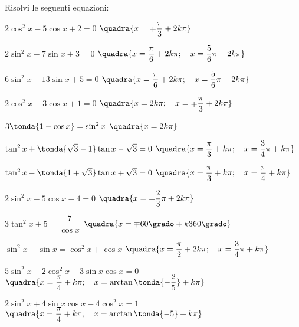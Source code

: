 \begin{esercizio}\label{ese:03.1}
Risolvi le seguenti equazioni:
 \begin{enumeratea}
  \item $2 \cos^2 x - 5 \cos x + 2 = 0$
   \hfill $\quadra{x = \mp \dfrac{\pi}{3} + 2 k \pi}$
  \item $2 \sin^2 x - 7 \sin x + 3 = 0$
   \hfill $\quadra{x = \dfrac{\pi}{6} + 2 k \pi; \quad
                   x = \dfrac{5}{6} \pi + 2 k \pi}$
  \item $6 \sin^2 x - 13 \sin x + 5 = 0$
   \hfill $\quadra{x = \dfrac{\pi}{6} + 2 k \pi; \quad
                   x = \dfrac{5}{6} \pi + 2 k \pi}$
  \item $2 \cos^2 x - 3 \cos x + 1 = 0$
   \hfill $\quadra{x = 2 k \pi; \quad 
                   x = \mp \dfrac{\pi}{3} + 2 k \pi}$
  \item $3 \tonda{1 - \cos x} = \sin^2 x$
   \hfill $\quadra{x = 2 k \pi}$
  \item $\tan^2 x + \tonda{\sqrt{3} - 1} \tan x - \sqrt{3} = 0$
   \hfill $\quadra{x = \dfrac{\pi}{3} + k \pi; \quad
                   x = \dfrac{3}{4} \pi + k \pi}$
  \item $\tan^2 x - \tonda{1 + \sqrt{3}} \tan x + \sqrt{3} = 0$
   \hfill $\quadra{x = \dfrac{\pi}{3} + k \pi; \quad
                   x = \dfrac{\pi}{4} + k \pi}$
  \item $2 \sin^2 x - 5 \cos x -4 = 0$
   \hfill $\quadra{x = \mp \dfrac{2}{3} \pi + 2 k \pi}$
  \item $3 \tan^2 x + 5 = \dfrac{7}{\cos x}$
   \hfill $\quadra{x = \mp 60 \grado + k 360 \grado}$
  \item $\sin^2 x - \sin x = \cos^2 x + \cos x$
   \hfill $\quadra{x = \dfrac{\pi}{2} + 2 k \pi; \quad
                   x = \dfrac{3}{4} \pi + k \pi}$
  \item $5 \sin^2 x - 2 \cos^2 x - 3 \sin x \cos x = 0$
   \hfill $\quadra{x = \dfrac{\pi}{4} + k \pi; \quad
                   x = \arctan \tonda{-\dfrac{2}{5}} + k \pi}$
  \item $2 \sin^2 x + 4 \sin x \cos x - 4 \cos^2 x = 1$
   \hfill $\quadra{x = \dfrac{\pi}{4} + k \pi; \quad
                   x = \arctan \tonda{- 5} + k \pi}$
 \end{enumeratea}
\end{esercizio}

\subsubsection*{}

